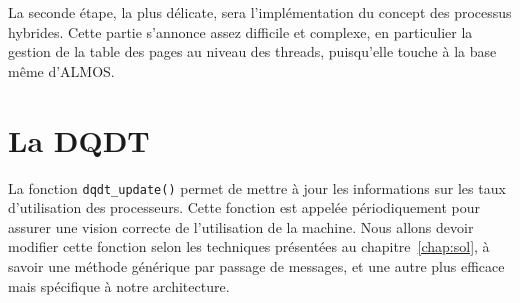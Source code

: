     La seconde étape, la plus délicate, sera l'implémentation du concept des
    processus hybrides. Cette partie s'annonce assez difficile et complexe, en
    particulier la gestion de la table des pages au niveau des threads,
    puisqu'elle touche à la base même d'ALMOS.


  \section{La DQDT}  

    La fonction \texttt{dqdt\_update()} permet de mettre à jour les informations
    sur les taux d'utilisation des processeurs. Cette fonction est appelée
    périodiquement pour assurer une vision correcte de l'utilisation de la
    machine. Nous allons devoir modifier cette fonction selon les techniques
    présentées au chapitre~\ref{chap:sol}, à savoir une méthode générique par
    passage de messages, et une autre plus efficace mais spécifique à notre
    architecture.
